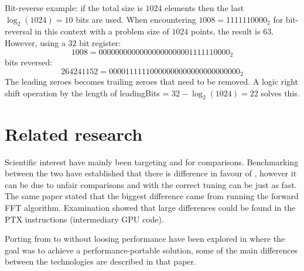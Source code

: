 Bit-reverse example: if the total size is $1024$ elements then the last $\log_{2}(1024) = 10$ bits are used. When encountering $1008 = 1111110000_{2}$ for bit-reversal in this context with a problem size of $1024$ points, the result is $63$. However, using a $32$ bit register:
\begin{equation}
	1008 = 00000000000000000000001111110000_{2}
\end{equation}
bits reversed:
\begin{equation}
	264241152 = 00001111110000000000000000000000_{2} 
\end{equation}
The leading zeroes becomes trailing zeroes that need to be removed. A logic right shift operation by the length of leadingBits = $32 - \log_{2}(1024) = 22$ solves this.

\section{Related research}

Scientific interest have mainly been targeting {\CU} and {\OCL} for comparisons. Benchmarking between the two have established that there is difference in favour of {\CU}, however it can be due to unfair comparisons\cite{fang2011comprehensive} and with the correct tuning {\OCL} can be just as fast. The same paper stated that the biggest difference came from running the forward \gls{FFT} algorithm. Examination showed that large differences could be found in the \gls{PTX} instructions (intermediary \gls{GPU} code).

Porting from {\CU} to {\OCL} without loosing performance have been explored in \cite{du2012cuda} where the goal was to achieve a performance-portable solution, some of the main differences between the technologies are described in that paper.